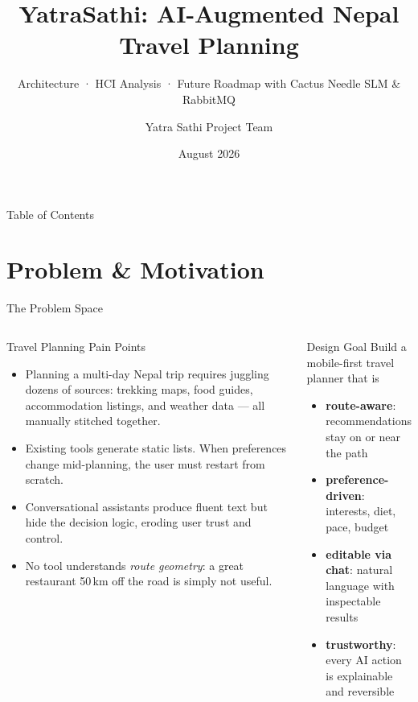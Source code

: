 \documentclass[aspectratio=169,professionalfonts]{beamer}
\title[YatraSathi]{YatraSathi: AI-Augmented Nepal Travel Planning}
\subtitle{Architecture · HCI Analysis · Future Roadmap with Cactus Needle SLM \& RabbitMQ}
\author{Yatra Sathi Project Team}
\institute{YatraSathi Application}
\date{August 2026}
\newcommand{\hl}[1]{\textbf{\textcolor{ysblue}{#1}}}
\begin{document}
\begin{frame}
  \titlepage
\end{frame}

\begin{frame}{Table of Contents}
  \tableofcontents[hideallsubsections]
\end{frame}

\section{Problem \& Motivation}

\begin{frame}{The Problem Space}
  \begin{columns}[T]
    \begin{block}{Travel Planning Pain Points}
      \begin{itemize}
        \item<1-> Planning a multi-day Nepal trip requires juggling dozens of
              sources: trekking maps, food guides, accommodation listings, and
              weather data — all manually stitched together.
        \item<2-> Existing tools generate static lists.  When preferences change
              mid-planning, the user must restart from scratch.
        \item<3-> Conversational assistants produce fluent text but hide the
              decision logic, eroding user trust and control.
        \item<4-> No tool understands \emph{route geometry}: a great restaurant
              50\,km off the road is simply not useful.
      \end{itemize}
    \end{block}

    \begin{block}{Design Goal}
      Build a mobile-first travel planner that is
      \begin{itemize}
        \item \hl{route-aware}: recommendations stay on or near the path
        \item \hl{preference-driven}: interests, diet, pace, budget
        \item \hl{editable via chat}: natural language with inspectable results
        \item \hl{trustworthy}: every AI action is explainable and reversible
      \end{itemize}
    \end{block}
  \end{columns}
\end{frame}
\end{document}
